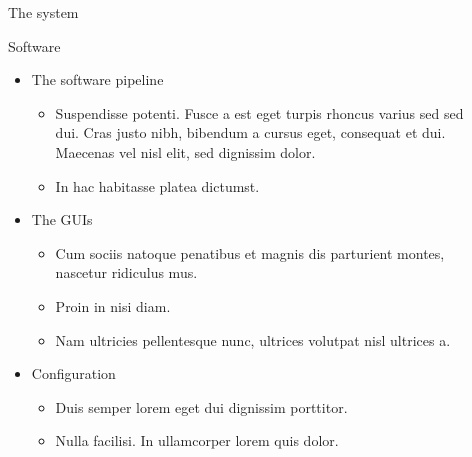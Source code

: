 \documentclass[final,hyperref={pdfpagelabels=false}]{beamer}
\begin{document}
\begin{frame}[t]
\begin{columns}[t]
\begin{column}{.465\textwidth}
\begin{block}{The system}
\end{block}


\begin{block}{Software}

\begin{itemize}
\item The software pipeline
\begin{itemize}
\item Suspendisse potenti. Fusce a est eget turpis rhoncus varius sed sed dui. Cras justo nibh, bibendum a cursus eget, consequat et dui. Maecenas vel nisl elit, sed dignissim dolor. 
\item In hac habitasse platea dictumst.
\end{itemize}

\item The GUIs
\begin{itemize}
\item Cum sociis natoque penatibus et magnis dis parturient montes, nascetur ridiculus mus. 
\item Proin in nisi diam.
\item Nam ultricies pellentesque nunc, ultrices volutpat nisl ultrices a.
\end{itemize}

\item Configuration 
\begin{itemize}
\item Duis semper lorem eget dui dignissim porttitor.
\item Nulla facilisi. In ullamcorper lorem quis dolor.
\end{itemize}
\end{itemize}

\end{block}


\end{column} %

\begin{column}{.03\textwidth}\end{column} %
 
\begin{column}{.465\textwidth} %



\end{column}
\end{columns}
\end{frame}
\end{document}
